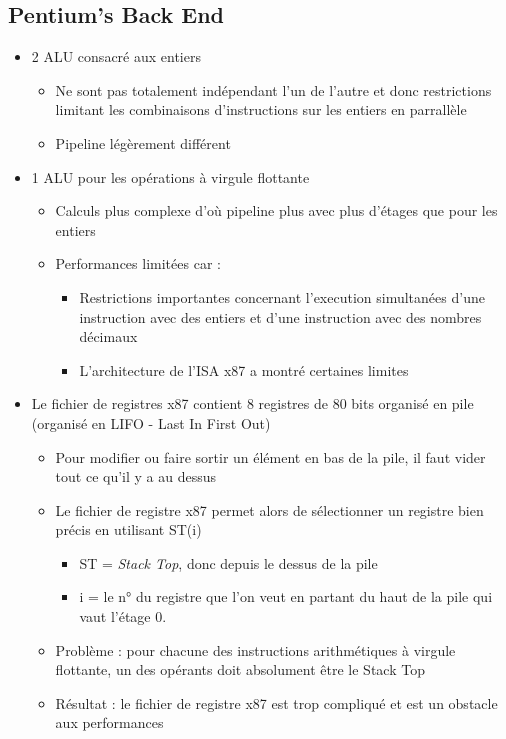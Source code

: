 \documentclass[a4paper]{article}
\begin{document}
    \subsection{Pentium's Back End}
    \begin{itemize}
      \item 2 ALU consacré aux entiers
      \begin{itemize}
        \item Ne sont pas totalement indépendant l'un de l'autre et donc restrictions
        limitant les combinaisons d’instructions sur les entiers en parrallèle
        \item Pipeline légèrement différent
      \end{itemize}
      \item 1 ALU pour les opérations à virgule flottante
      \begin{itemize}
        \item Calculs plus complexe d'où pipeline plus avec plus d'étages que pour les entiers
        \item Performances limitées car :
        \begin{itemize}
          \item Restrictions importantes concernant l'execution simultanées d'une instruction avec des entiers et d'une instruction avec des nombres décimaux
          \item L'architecture de l'ISA x87 a montré certaines limites
        \end{itemize}
      \end{itemize}
      \item Le fichier de registres x87 contient 8 registres de 80 bits organisé en pile (organisé en LIFO - Last In First Out)
      \begin{itemize}
        \item Pour modifier ou faire sortir un élément en bas de la pile, il faut vider tout ce qu'il y a au dessus
        \item Le fichier de registre x87 permet alors de sélectionner un registre bien précis en utilisant ST(i)
        \begin{itemize}
          \item ST = \emph{Stack Top}, donc depuis le dessus de la pile
          \item i = le n° du registre que l'on veut en partant du haut de la pile qui vaut l'étage 0.
        \end{itemize}
        \item Problème : pour chacune des instructions arithmétiques à virgule flottante, un des opérants doit absolument être le Stack Top
        \item Résultat : le fichier de registre x87 est trop compliqué et est un obstacle aux performances
      \end{itemize}
    \end{itemize}
\end{document}
